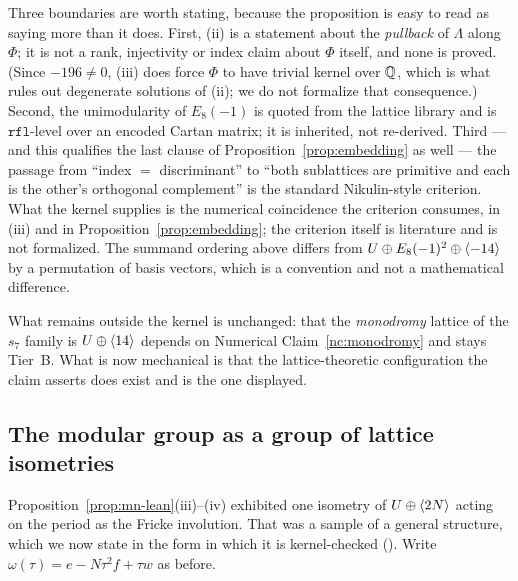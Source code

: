 Three boundaries are worth stating, because the proposition is easy to read as
saying more than it does. First, (ii) is a statement about the \emph{pullback}
of $\Lambda$ along $\Phi$; it is not a rank, injectivity or index claim about
$\Phi$ itself, and none is proved. (Since $-196\neq0$, (iii) does force $\Phi$
to have trivial kernel over $\mathbb{Q}$, which is what rules out degenerate solutions
of (ii); we do not formalize that consequence.) Second, the unimodularity of
$E_8(-1)$ is quoted from the lattice library and is $\mathtt{rfl}$-level over an
encoded Cartan matrix; it is inherited, not re-derived. Third --- and this
qualifies the last clause of Proposition~\ref{prop:embedding} as well --- the
passage from ``index $=$ discriminant'' to ``both sublattices are primitive and
each is the other's orthogonal complement'' is the standard Nikulin-style
criterion. What the kernel supplies is the numerical coincidence the criterion
consumes, in (iii) and in Proposition~\ref{prop:embedding}; the criterion
itself is literature and is not formalized. The summand ordering above differs
from $U\oplus E_8(-1)^2\oplus\langle -14\rangle$ by a permutation of basis vectors,
which is a convention and not a mathematical difference.

What remains outside the kernel is unchanged: that the \emph{monodromy} lattice
of the $s_7$ family is $U\oplus\langle 14\rangle$ depends on Numerical
Claim~\ref{nc:monodromy} and stays Tier~B. What is now mechanical is that the
lattice-theoretic configuration the claim asserts does exist and is the one
displayed.

\subsection{The modular group as a group of lattice isometries}\label{subsec:modular-action}

Proposition~\ref{prop:mn-lean}(iii)--(iv) exhibited one isometry of
$U\oplus\langle 2N\rangle$ acting on the period as the Fricke involution. That was a
sample of a general structure, which we now state in the form in which it is
kernel-checked (). Write
$\omega(\tau) = e - N\tau^2 f + \tau w$ as before.

